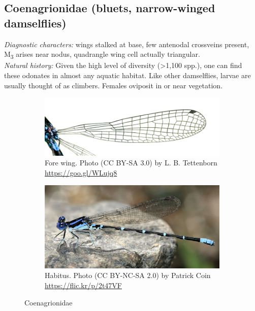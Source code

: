 \documentclass[letterpaper, 11pt]{article}
\begin{document}
\subsection{Coenagrionidae (bluets, narrow-winged damselflies)}
\noindent{}\textit{Diagnostic characters:} wings stalked at base, few antenodal crossveins present, \texorpdfstring{M\textsubscript{3}}{ }{ } arises near nodus, quadrangle wing cell actually triangular.\\

\noindent{}\textit{Natural history:} Given the high level of diversity (\textgreater1,100 spp.), one can find these odonates in almost any aquatic habitat. Like other damselflies, larvae are usually thought of as climbers. Females oviposit in or near vegetation.\\

\begin{figure}[ht!]
    \centering
    \begin{subfigure}[ht!]{0.45\textwidth}
        \includegraphics[width=\textwidth]{CoenagrionidWing}
        \caption{Fore wing. Photo (CC BY-SA 3.0) by L. B. Tettenborn \url{https://goo.gl/WLujq8}}
        \label{fig:coenwing}
    \end{subfigure}
    \hfill
    \begin{subfigure}[ht!]{0.45\textwidth}
        \includegraphics[width=\textwidth]{CoenagrionidHabitus}
        \caption{Habitus. Photo (CC BY-NC-SA 2.0) by Patrick Coin \url{https://flic.kr/p/2t47VF}}
        \label{fig:coenbody}
    \end{subfigure}
    \caption{Coenagrionidae}\label{fig:coenag}
\end{figure}
\end{document}
